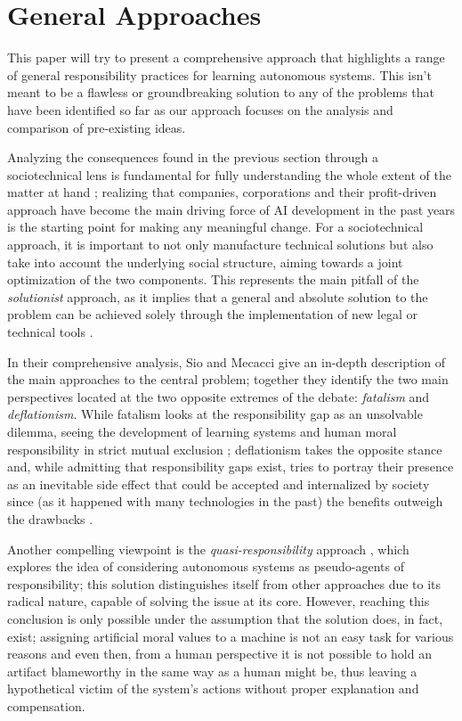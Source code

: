 \section{General Approaches}\label{sec:approaches}

This paper will try to present a comprehensive approach that highlights a range of general responsibility practices for learning autonomous systems.
This isn't meant to be a flawless or groundbreaking solution to any of the problems that have been identified so far as our approach focuses on the analysis and comparison of pre-existing ideas.

Analyzing the consequences found in the previous section through a sociotechnical lens is fundamental for fully un\-der\-stand\-ing the whole extent of the matter at hand \parencite{THETE, NOVAIA}; realizing that companies, corporations and their profit-driven approach have become the main driving force of AI development in the past years is the starting point for making any meaningful change.
For a sociotechnical approach, it is important to not only manufacture technical solutions but also take into account the underlying social structure, aiming towards a joint optimization of the two components.
This represents the main pitfall of the \textit{solutionist} approach, as it implies that a general and absolute solution to the problem can be achieved solely through the implementation of new legal or technical tools \parencite{MORTSE, STILML, SANFRG}.

In their comprehensive analysis, Sio and Mecacci give an in-depth description of the main approaches to the central problem; together they identify the two main perspectives located at the two opposite extremes of the debate: \textit{fatalism} and \textit{deflationism}.
While fatalism looks at the responsibility gap as an unsolvable dilemma, seeing the development of learning systems and human moral responsibility in strict mutual exclusion \parencite{MATTRG}; deflationism takes the opposite stance and, while admitting that responsibility gaps exist, tries to portray their presence as an inevitable side effect that could be accepted and internalized by society since (as it happened with many technologies in the past) the benefits outweigh the drawbacks \parencite{HAYTMP, SIJWA}.

Another compelling viewpoint is the \textit{quasi-responsibility} approach \parencite{STARCA}, which explores the idea of considering autonomous systems as pseudo-agents of responsibility; this solution distinguishes itself from other approaches due to its radical nature, capable of solving the issue at its core.
However, reaching this conclusion is only possible under the assumption that the solution does, in fact, exist; assigning artificial moral values to a machine is not an easy task for various reasons and even then, from a human perspective it is not possible to hold an artifact blameworthy in the same way as a human might be, thus leaving a hypothetical victim of the system's actions without proper explanation and compensation.